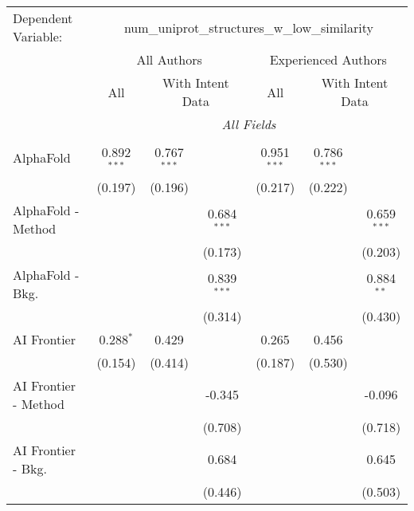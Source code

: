 \begingroup
\centering
\begin{tabular}{lcccccc}
   \tabularnewline \midrule \midrule
   Dependent Variable: & \multicolumn{6}{c}{num\_uniprot\_structures\_w\_low\_similarity}\\
 & \multicolumn{3}{c}{All Authors} & \multicolumn{3}{c}{Experienced Authors} \\
\cmidrule(lr){2-4} \cmidrule(lr){5-7}
 & \multicolumn{1}{c}{All} & \multicolumn{2}{c}{With Intent Data} & \multicolumn{1}{c}{All} & \multicolumn{2}{c}{With Intent Data} \\
\cmidrule(lr){2-2} \cmidrule(lr){3-4} \cmidrule(lr){5-5} \cmidrule(lr){6-7}
 & \multicolumn{6}{c}{\textit{All Fields}} \\ \\
   AlphaFold            & 0.892$^{***}$ & 0.767$^{***}$ &               & 0.951$^{***}$ & 0.786$^{***}$ &   \\   
                        & (0.197)       & (0.196)       &               & (0.217)       & (0.222)       &   \\   
   AlphaFold - Method   &               &               & 0.684$^{***}$ &               &               & 0.659$^{***}$\\   
                        &               &               & (0.173)       &               &               & (0.203)\\   
   AlphaFold - Bkg.     &               &               & 0.839$^{***}$ &               &               & 0.884$^{**}$\\   
                        &               &               & (0.314)       &               &               & (0.430)\\   
   AI Frontier          & 0.288$^{*}$   & 0.429         &               & 0.265         & 0.456         &   \\   
                        & (0.154)       & (0.414)       &               & (0.187)       & (0.530)       &   \\   
   AI Frontier - Method &               &               & -0.345        &               &               & -0.096\\   
                        &               &               & (0.708)       &               &               & (0.718)\\   
   AI Frontier - Bkg.   &               &               & 0.684         &               &               & 0.645\\   
                        &               &               & (0.446)       &               &               & (0.503)\\   

\end{tabular}
